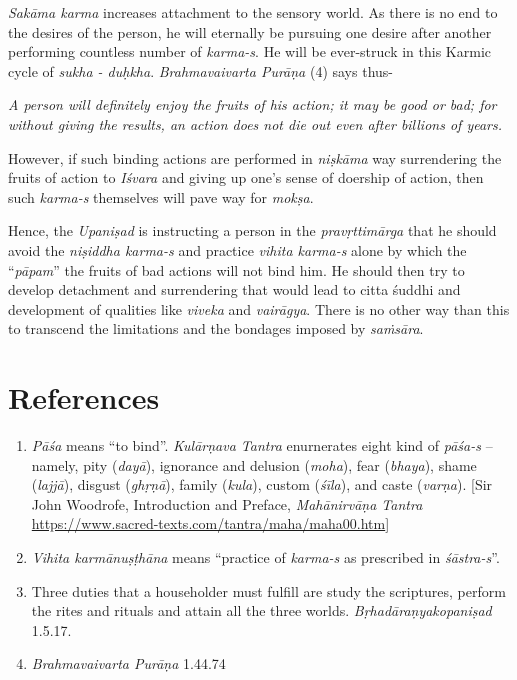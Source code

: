 \emph{Sakāma karma} increases attachment to the sensory world. As there is no end to the desires of the person, he will eternally be pursuing one desire after another performing countless number of \emph{karma-s}. He will be ever-struck in this Karmic cycle of \emph{sukha - duḥkha}. \emph{Brahmavaivarta Purāṇa} (4) says thus-

\emph{A person will definitely enjoy the fruits of his action; it may be good or bad; for without giving the results, an action does not die out even after billions of years.}

However, if such binding actions are performed in \emph{niṣkāma} way surrendering the fruits of action to \emph{Iśvara} and giving up one's sense of doership of action, then such \emph{karma-s} themselves will pave way for \emph{mokṣa}.

Hence, the \emph{Upaniṣad} is instructing a person in the \emph{pravṛttimārga} that he should avoid the \emph{niṣiddha karma-s} and practice \emph{vihita karma-s} alone by which the ``\emph{pāpam}'' the fruits of bad actions will not bind him. He should then try to develop detachment and surrendering that would lead to citta śuddhi and development of qualities like \emph{viveka} and \emph{vairāgya}. There is no other way than this to transcend the limitations and the bondages imposed by \emph{saṁsāra}.

\section*{References}

\begin{enumerate}
\item
  \emph{Pāśa} means ``to bind''. \emph{Kulārṇava Tantra} enurnerates eight kind of \emph{pāśa-s} -- namely, pity (\emph{dayā}), ignorance and delusion (\emph{moha}), fear (\emph{bhaya}), shame (\emph{lajjā}), disgust (\emph{ghṛṇā}), family (\emph{kula}), custom (\emph{śīla}), and caste (\emph{varṇa}). {[}Sir John Woodrofe, Introduction and Preface, \emph{Mahānirvāṇa Tantra} \url{https://www.sacred-texts.com/tantra/maha/maha00.htm}{]}
\item
  \emph{Vihita karmānuṣṭhāna} means ``practice of \emph{karma-s} as prescribed in \emph{śāstra-s}''.
\item
  Three duties that a householder must fulfill are study the scriptures, perform the rites and rituals and attain all the three worlds. \emph{Bṛhadāraṇyakopaniṣad} 1.5.17.
\item
  \emph{Brahmavaivarta Purāṇa} 1.44.74
\end{enumerate}
